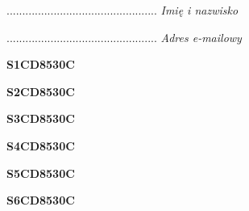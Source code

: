 \begin{turn}{90}\begin{minipage}{\linewidth} \vspace{20mm} ................................................  \textit{Imię i nazwisko}\end{minipage}\end{turn}

\begin{turn}{90}\begin{minipage}{\linewidth} \vspace{20mm} ................................................  \textit{Adres e-mailowy}\end{minipage}\end{turn}

\begin{turn}{90}\huge \begin{minipage}{\linewidth} \vspace{10mm}\textbf{S1CD8530C}\end{minipage}\end{turn}

\begin{turn}{90}\huge \begin{minipage}{\linewidth} \vspace{10mm}\textbf{S2CD8530C}\end{minipage}\end{turn}

\begin{turn}{90}\huge \begin{minipage}{\linewidth} \vspace{10mm}\textbf{S3CD8530C}\end{minipage}\end{turn}

\begin{turn}{90}\huge \begin{minipage}{\linewidth} \vspace{10mm}\textbf{S4CD8530C}\end{minipage}\end{turn}

\begin{turn}{90}\huge \begin{minipage}{\linewidth} \vspace{10mm}\textbf{S5CD8530C}\end{minipage}\end{turn}

\begin{turn}{90}\huge \begin{minipage}{\linewidth} \vspace{10mm}\textbf{S6CD8530C}\end{minipage}\end{turn}

